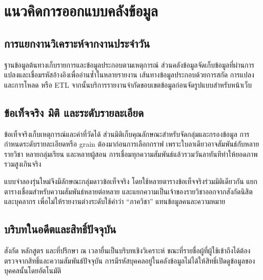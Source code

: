 \section{แนวคิดการออกแบบคลังข้อมูล}
\subsection{การแยกงานวิเคราะห์จากงานประจำวัน}
ฐานข้อมูลต้นทางเก็บรายการและข้อมูลประกอบตามเหตุการณ์ ส่วนคลังข้อมูลจัดเก็บข้อมูลที่ผ่านการแปลงและเชื่อมรหัสอ้างอิงเพื่ออ่านซ้ำในหลายรายงาน เส้นทางข้อมูลประกอบด้วยการสกัด การแปลง และการโหลด หรือ ETL จากนั้นบริการรายงานจำกัดขอบเขตข้อมูลก่อนจัดรูปแบบสำหรับหน้าเว็บ

\subsection{ข้อเท็จจริง มิติ และระดับรายละเอียด}
ข้อเท็จจริงเก็บเหตุการณ์และค่าที่วัดได้ ส่วนมิติเก็บคุณลักษณะสำหรับจัดกลุ่มและกรองข้อมูล การกำหนดระดับรายละเอียดหรือ grain ต้องมาก่อนการเลือกกราฟ เพราะใบลาเดียวอาจสัมพันธ์กับหลายรายวิชา หลายกลุ่มเรียน และหลายผู้สอน การเชื่อมทุกความสัมพันธ์แล้วรวมวันลาทันทีทำให้ยอดภาพรวมสูงเกินจริง

แบบจำลองรุ่นใหม่จึงมีลักษณะกลุ่มดาวข้อเท็จจริง โดยใช้หลายตารางข้อเท็จจริงร่วมมิติเดียวกัน แยกตารางเชื่อมสำหรับความสัมพันธ์หลายต่อหลาย และแยกความเป็นเจ้าของรายวิชาออกจากสังกัดนิสิตและบุคลากร เพื่อไม่ให้รายงานต่างระดับใช้คำว่า ``ภาควิชา'' แทนข้อมูลคนละความหมาย

\subsection{บริบทในอดีตและสิทธิ์ปัจจุบัน}
สังกัด หลักสูตร และที่ปรึกษา ณ เวลายื่นเป็นบริบทเชิงวิเคราะห์ ขณะที่รายชื่อผู้ที่ผู้ใช้เข้าถึงได้ต้องตรวจจากสิทธิ์และความสัมพันธ์ปัจจุบัน การมีรหัสบุคคลอยู่ในคลังข้อมูลไม่ได้ให้สิทธิ์เปิดดูข้อมูลของบุคคลนั้นโดยอัตโนมัติ
